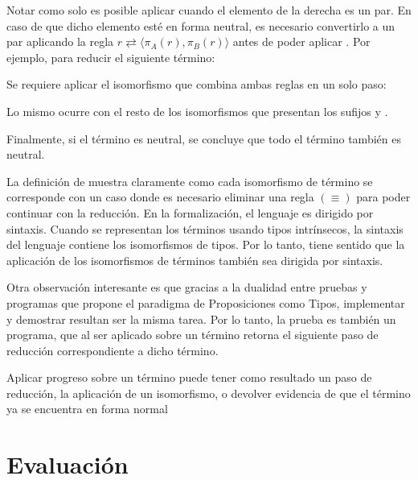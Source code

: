 
Notar como solo es posible aplicar  cuando el elemento de la derecha es un par.
En caso de que dicho elemento esté en forma neutral, es necesario convertirlo a un par aplicando la regla $r \rightleftarrows \langle \pi_A (r), \pi_B(r) \rangle$ antes de poder aplicar .
Por ejemplo, para reducir el siguiente término:


Se requiere aplicar el isomorfismo  que combina ambas reglas en un solo paso:


Lo mismo ocurre con el resto de los isomorfismos que presentan los sufijos  y \const{$\eta$}.

Finalmente, si el término  es neutral, se concluye que todo el término también es neutral.

La definición de  muestra claramente como cada isomorfismo de término se corresponde con un caso donde es necesario eliminar una regla $(\equiv)$ para poder continuar con la reducción.
En la formalización, el lenguaje es dirigido por sintaxis.
Cuando se representan los términos usando tipos intrínsecos, la sintaxis del lenguaje contiene los isomorfismos de tipos.
Por lo tanto, tiene sentido que la aplicación de los isomorfismos de términos también sea dirigida por sintaxis.

Otra observación interesante es que gracias a la dualidad entre pruebas y programas que propone el paradigma de Proposiciones como Tipos, implementar y demostrar resultan ser la misma tarea.
Por lo tanto, la prueba  es también un programa, que al ser aplicado sobre un término retorna el siguiente paso de reducción correspondiente a dicho término.

\begin{example}
	Aplicar progreso sobre un término puede tener como resultado un paso de reducción, la aplicación de un isomorfismo, o devolver evidencia de que el término ya se encuentra en forma normal
\end{example}

\section{Evaluación}

